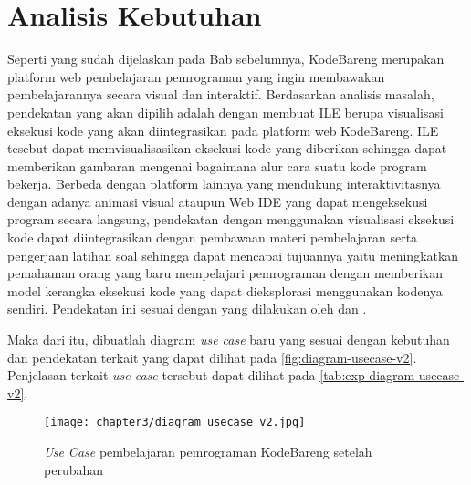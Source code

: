 
\section{Analisis Kebutuhan} \label{sec:analisis-kebutuhan}
Seperti yang sudah dijelaskan pada Bab sebelumnya, KodeBareng merupakan platform web pembelajaran pemrograman yang ingin membawakan pembelajarannya secara visual dan interaktif. Berdasarkan analisis masalah, pendekatan yang akan dipilih adalah dengan membuat ILE berupa visualisasi eksekusi kode yang akan diintegrasikan pada platform web KodeBareng. ILE tesebut dapat memvisualisasikan eksekusi kode yang diberikan sehingga dapat memberikan gambaran mengenai bagaimana alur cara suatu kode program bekerja. Berbeda dengan platform lainnya yang mendukung interaktivitasnya dengan adanya animasi visual ataupun Web IDE yang dapat mengeksekusi program secara langsung, pendekatan dengan menggunakan visualisasi eksekusi kode dapat diintegrasikan dengan pembawaan materi pembelajaran serta pengerjaan latihan soal sehingga dapat mencapai tujuannya yaitu meningkatkan pemahaman orang yang baru mempelajari pemrograman dengan memberikan model kerangka eksekusi kode yang dapat dieksplorasi menggunakan kodenya sendiri. Pendekatan ini sesuai dengan yang dilakukan oleh \textcite{moons2013pilot} dan \textcite{mayer1981psychology}.

Maka dari itu, dibuatlah diagram \textit{use case} baru yang sesuai dengan kebutuhan dan pendekatan terkait yang dapat dilihat pada \autoref{fig:diagram-usecase-v2}. Penjelasan terkait \textit{use case} tersebut dapat dilihat pada \autoref{tab:exp-diagram-usecase-v2}.

\begin{figure}[H]
  \centering
  \texttt{[image: chapter3/diagram\_usecase\_v2.jpg]}
  \caption{\textit{Use Case} pembelajaran pemrograman KodeBareng setelah perubahan} \label{fig:diagram-usecase-v2}
\end{figure}

